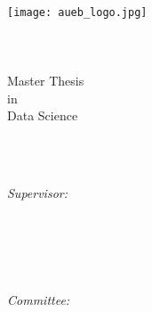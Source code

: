 %


\begin{titlepage}
	\tgherosfont
	\centering
	
	{\Large \thesisUniversity} \\[4mm]
	\texttt{[image: aueb\_logo.jpg]} \\[2mm]
	\textsf{\thesisUniversityInstitute} \\
	\textsf{\thesisUniversityDepartment} \\
	\textsf{\thesisUniversityCity} \\
	\vfill
	\Large{Master Thesis} \\
	\textsf{in} \\
	\Large{Data Science}
	
	\vfill
	
	{\LARGE \textbf{\thesisTitle} \\[4mm]}
	{\Large \thesisAuthor} \\
	
	\vfill
	\vfill
	
	
	\begin{minipage}[t]{.27\textwidth}
		\raggedleft
		\textit{Supervisor:}
	\end{minipage}
	\hspace*{15pt}
	\begin{minipage}[t]{.65\textwidth}
		{\Large \thesisSupervisorTitle\ \thesisSupervisor} \\
		{\small \thesisSupervisorDepartment} \\[-1mm]
		{\small \thesisSupervisorUniversity}
	\end{minipage} \\[15mm]
	
	\begin{minipage}[t]{.27\textwidth}
		\raggedleft
		\textit{Committee:}
	\end{minipage}
	\hspace*{15pt}
	\begin{minipage}[t]{.65\textwidth}
		{\Large \thesisReviewerOneTitle\ \thesisReviewerOne} \\
		{\small \thesisReviewerOneDepartment} \\[-1mm]
		{\small \thesisReviewerOneUniversity}
	\end{minipage} \\[5mm]
	

\end{titlepage}
